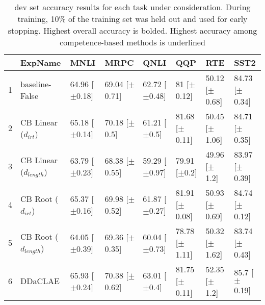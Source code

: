 \begin{table}[ht]
\centering
\begin{tabular}{rlllllll}
  \toprule
 & ExpName & MNLI & MRPC & QNLI & QQP & RTE & SST2 \\ 
  \midrule
1 & baseline-False & 64.96 [$\pm$0.18] & 69.04 [$\pm$0.71] & 62.72 [$\pm$0.48] & 81 [$\pm$0.12] & 50.12 [$\pm$0.68] & 84.73 [$\pm$0.34] \\ 
  2 & CB Linear ($d_{irt}$) & 65.18 [$\pm$0.14] & 70.18 [$\pm$0.5] & 61.21 [$\pm$0.5] & 81.68 [$\pm$0.11] & 50.45 [$\pm$1.06] & 84.71 [$\pm$0.35] \\ 
  3 & CB Linear ($d_{length}$) & 63.79 [$\pm$0.23] & 68.38 [$\pm$0.55] & 59.29 [$\pm$0.97] & 79.91 [$\pm$0.2] & 49.96 [$\pm$1.2] & 83.97 [$\pm$0.39] \\ 
  4 & CB Root ($d_{irt}$) & 65.37 [$\pm$0.16] & 69.98 [$\pm$0.52] & 61.87 [$\pm$0.27] & 81.91 [$\pm$0.08] & 50.93 [$\pm$0.69] & 84.74 [$\pm$0.12] \\ 
  5 & CB Root ($d_{length}$) & 64.05 [$\pm$0.39] & 69.36 [$\pm$0.35] & 60.04 [$\pm$0.73] & 78.78 [$\pm$1.11] & 50.32 [$\pm$1.62] & 83.74 [$\pm$0.43] \\ 
  6 & DDaCLAE & 65.93 [$\pm$0.24] & 70.38 [$\pm$0.62] & 63.01 [$\pm$0.4] & 81.75 [$\pm$0.11] & 52.35 [$\pm$1.2] & 85.7 [$\pm$0.19] \\ 
   \bottomrule
\end{tabular}
\caption{dev set accuracy results for each task under consideration. During training, 10\% of the training set was held out and used for early stopping. Highest overall accuracy is bolded. Highest accuracy among competence-based methods is underlined} 
\end{table}
